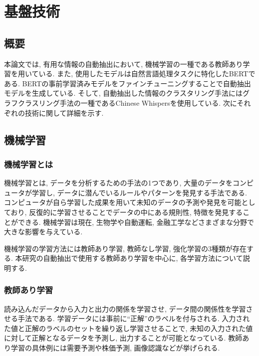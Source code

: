 \chapter{基盤技術}
\label{chap:kibangijyutu}



\section{概要}
本論文では, 有用な情報の自動抽出において, 機械学習の一種である教師あり学習を用いている. 
また, 使用したモデルは自然言語処理タスクに特化したBERTである. BERTの事前学習済みモデルをファインチューニングすることで自動抽出モデルを生成している. 
そして, 自動抽出した情報のクラスタリング手法にはグラフクラスリング手法の一種であるChinese Whispersを使用している. 
次にそれぞれの技術に関して詳細を示す. 


\section{機械学習}
\subsection{機械学習とは}
機械学習とは, データを分析するための手法の1つであり, 大量のデータをコンピュータが学習し, データに潜んでいるルールやパターンを発見する手法である. コンピュータが自ら学習した成果を用いて未知のデータの予測や発見を可能としており, 反復的に学習させることでデータの中にある規則性, 特徴を発見することができる. 機械学習は現在, 生物学や自動運転, 金融工学などさまざまな分野で大きな影響を与えている. 

機械学習の学習方法には教師あり学習, 教師なし学習, 強化学習の3種類が存在する. 本研究の自動抽出で使用する教師あり学習を中心に, 各学習方法について説明する. 

\subsection{教師あり学習}
読み込んだデータから入力と出力の関係を学習させ, データ間の関係性を学習させる手法である. 学習データには事前に``正解''のラベルを付与される. 
入力された値と正解のラベルのセットを繰り返し学習させることで, 未知の入力された値に対して正解となるデータを予測し, 出力することが可能となっている. 
教師あり学習の具体例には需要予測や株価予測, 画像認識などが挙げられる. 

